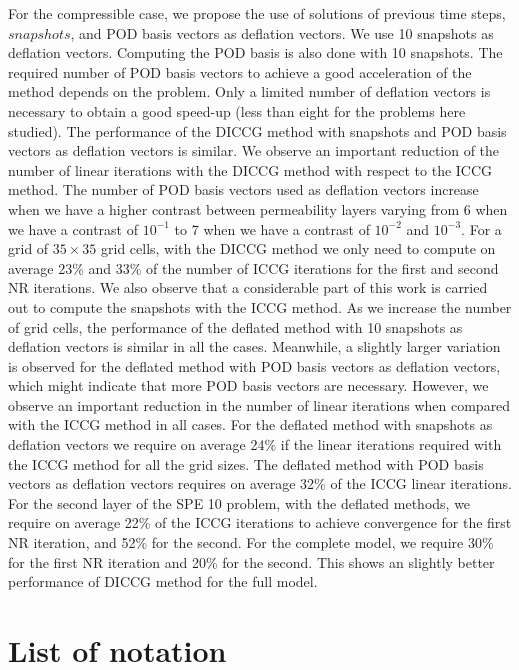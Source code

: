 \documentclass[12pt]{article}
\begin{document}
For the compressible case, we propose the use of solutions of previous time steps, $snapshots$, and POD basis vectors as deflation vectors. We use 10 snapshots as deflation vectors. Computing the POD basis is also done with 10 snapshots. The required number of POD basis vectors to achieve a good acceleration of the method depends on the problem. Only a limited number of deflation vectors is necessary to obtain a good speed-up (less than eight for the problems here studied). The performance of the DICCG method with snapshots and POD basis vectors as deflation vectors is similar. We observe an important reduction of the number of linear iterations with the DICCG method with respect to the ICCG method. The number of POD basis vectors used as deflation vectors increase when we have a higher contrast between permeability layers varying from 6 when we have a contrast of $10^{-1}$ to 7 when we have a contrast of $10^{-2}$ and $10^{-3}$.  For a grid of $35\times 35$ grid cells, with the DICCG method we only need to 
compute on average 23\% and 33\% of the number of ICCG iterations for the first and second NR iterations. We also observe that a considerable part of this work is carried out to compute the snapshots with the ICCG method. 
As we increase the number of grid cells, the performance of the deflated method with 10 snapshots as deflation vectors is similar in all the cases. Meanwhile, a slightly larger variation is observed for the deflated method with POD basis vectors as deflation vectors, which might indicate that more POD basis vectors are necessary. However, we observe an important reduction in the number of linear iterations when compared with the ICCG method in all cases. For the deflated method with snapshots as deflation vectors we require on average 24\% if the linear iterations required with the ICCG method for all the grid sizes. The deflated method with POD basis vectors as deflation vectors requires on average 32\% of the ICCG linear iterations.
For the second layer of the SPE 10 problem, with the deflated methods, we require on average 22\% of the ICCG iterations to achieve convergence for the first NR iteration, and 52\% for the second. For the complete model, we require 30\% for the first NR iteration and 20\% for the second. This shows an slightly better performance of DICCG method for the full model.



\newpage

 
 \newpage
 
% 
\newpage
\newpage
\appendix
\section{List of notation}\label{a1}
\end{document}
